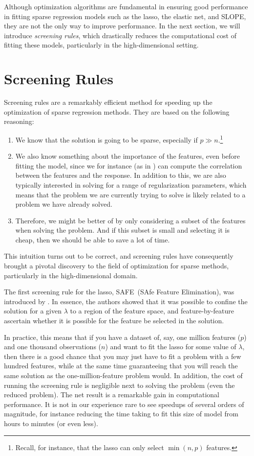 Although optimization algorithms are fundamental in ensuring good performance in fitting sparse regression models such as the lasso, the elastic net, and SLOPE, they are not the only way to improve performance. In the next section, we will introduce \emph{screening rules}, which drastically reduces the computational cost of fitting these models, particularly in the high-dimensional setting.

\section{Screening Rules}\label{sec:screening-rules}

Screening rules are a remarkably efficient method for speeding up the optimization of sparse regression methods. They are based on the following reasoning:
\begin{enumerate}
  \item We know that the solution is going to be sparse, especially if \(p \gg n\).\footnote{Recall, for instance, that the lasso can only select \(\min(n, p)\) features.}
  \item We also know something about the importance of the features, even before fitting the model, since we for instance (as in ) can compute the correlation between the features and the response. In addition to this, we are also typically interested in solving for a range of regularization parameters, which means that the problem we are currently trying to solve is likely related to a problem we have already solved.
  \item Therefore, we might be better of by only considering a subset of the features when solving the problem. And if this subset is small and selecting it is cheap, then we should be able to save a lot of time.
\end{enumerate}
This intuition turns out to be correct, and screening rules have consequently brought a pivotal discovery to the field of optimization for sparse methods, particularly in the high-dimensional domain.

The first screening rule for the lasso, SAFE~(SAfe Feature Elimination), was introduced by \textcite{elghaoui2010}. In essence, the authors showed that it was possible to confine the solution for a given \(\lambda\) to a region of the feature space, and feature-by-feature ascertain whether it is possible for the feature be selected in the solution.

In practice, this means that if you have a dataset of, say, one million features (\(p\)) and one thousand observations (\(n\)) and want to fit the lasso for some value of \(\lambda\), then there is a good chance that you may just have to fit a problem with a few hundred features, while at the same time guaranteeing that you will reach the same solution as the one-million-feature problem would. In addition, the cost of running the screening rule is negligible next to solving the problem (even the reduced problem). The net result is a remarkable gain in computational performance. It is not in our experience rare to see speedups of several orders of magnitude, for instance reducing the time taking to fit this size of model from hours to minutes (or even less).

